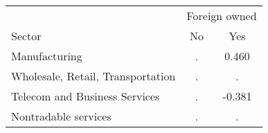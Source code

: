 \begin{tabular}{lcc}
\toprule
 & \multicolumn{2}{c}{Foreign owned} \\
\cmidrule(lr){2-3}
Sector & No & Yes \\
\midrule
Manufacturing & . & 0.460 \\
Wholesale, Retail, Transportation & . & . \\
Telecom and Business Services & . & -0.381 \\
Nontradable services & . & . \\
\bottomrule
\end{tabular}
